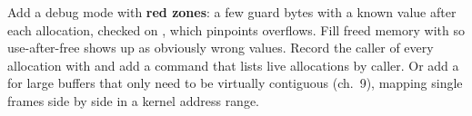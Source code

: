 \documentclass[11pt,a4paper]{article}
\begin{document}
Add a debug mode with \textbf{red zones}: a few guard bytes with a known value after each allocation, checked on
, which pinpoints overflows. Fill freed memory with  so use-after-free shows up as
obviously wrong values. Record the caller of every allocation with  and add a
 command that lists live allocations by caller. Or add a  for large buffers that only need to be virtually contiguous (\LKP ch.~9), mapping single
frames side by side in a kernel address range.

\booklegend
\end{document}

